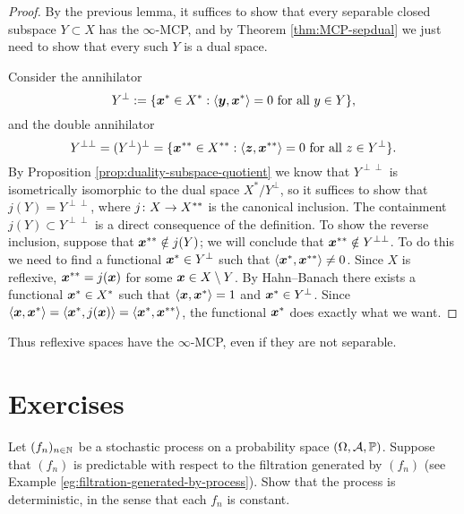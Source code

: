 \begin{proof}
  By the previous lemma, it suffices to show that every separable closed subspace $Y \subset X$ has the $\infty$-MCP, and by Theorem \ref{thm:MCP-sepdual} we just need to show that every such $Y$ is a dual space.
  
  Consider the annihilator
  \begin{equation*}
    Y^{\perp} := \{\bm{x}^* \in X^* :  \text{$\langle \bm{y}, \bm{x}^* \rangle = 0$ for all $y \in Y$}\},
  \end{equation*}
  and the double annihilator
  \begin{equation*}
    Y^{\perp\perp} = (Y^\perp)^\perp = \{\bm{x}^{**} \in X^{**} : \text{$\langle \bm{z}, \bm{x}^{**} \rangle = 0$ for all $z \in Y^\perp$}\}.
  \end{equation*}
  By Proposition \ref{prop:duality-subspace-quotient} we know that $Y^{\perp\perp}$ is isometrically isomorphic to the dual space $X^*/Y^\perp$, so it suffices to show that $j(Y) = Y^{\perp\perp}$, where $j \colon X \rightarrow X^{**}$ is the canonical inclusion.
  The containment $j(Y) \subset Y^{\perp\perp}$ is a direct consequence of the definition.
  To show the reverse inclusion, suppose that $\bm{x}^{**} \notin j(Y)$; we will conclude that $\bm{x}^{**} \notin Y^{\perp\perp}$.
  To do this we need to find a functional $\bm{x}^* \in Y^{\perp}$ such that $\langle\bm{x}^*, \bm{x}^{**}\rangle \neq 0$.
  Since $X$ is reflexive, $\bm{x}^{**} = j(\bm{x})$ for some $\bm{x} \in X \setminus Y$.
  By Hahn--Banach there exists a functional $\bm{x}^* \in X^*$ such that $\langle \bm{x}, \bm{x}^* \rangle = 1$ and $\bm{x}^* \in Y^\perp$.
  Since $\langle \bm{x}, \bm{x}^* \rangle = \langle \bm{x}^*, j(\bm{x}) \rangle = \langle \bm{x}^*, \bm{x}^{**} \rangle$, the functional $\bm{x}^*$ does exactly what we want.
\end{proof}

Thus reflexive spaces have the $\infty$-MCP, even if they are not separable.


\section*{Exercises}

\begin{exercise}
  Let $(f_n)_{n \in \mathbb{N}}$ be a stochastic process on a probability space $(\Omega,\mathcal{A},\mathbb{P})$.
  Suppose that $(f_n)$ is predictable with respect to the filtration generated by $(f_n)$ (see Example \ref{eg:filtration-generated-by-process}).
  Show that the process is deterministic, in the sense that each $f_n$ is constant.
\end{exercise}

